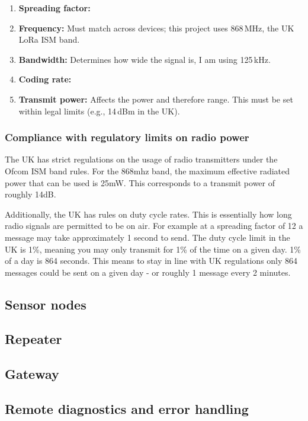 \begin{enumerate}
  \item \textbf{Spreading factor:}
  \item \textbf{Frequency:} Must match across devices; this project uses
        868\,MHz, the UK LoRa ISM band.
  \item \textbf{Bandwidth:} Determines how wide the signal is, I am using
        125\,kHz.
  \item \textbf{Coding rate:}
  \item \textbf{Transmit power:} Affects the power and therefore range. This
        must be set within legal limits (e.g., 14\,dBm in the UK).
\end{enumerate}

\subsubsection{Compliance with regulatory limits on radio power}

The UK has strict regulations on the usage of radio transmitters under the Ofcom
ISM band rules. For the 868mhz band, the maximum effective radiated power that
can be used is 25mW. This corresponds to a transmit power of roughly 14dB.

Additionally, the UK has rules on duty cycle rates. This is essentially how long
radio signals are permitted to be on air. For example at a spreading factor of
12 a message may take approximately 1 second to send. The duty cycle limit in
the UK is 1\%, meaning you may only transmit for 1\% of the time on a given day.
1\% of a day is 864 seconds. This means to stay in line with UK regulations only
864 messages could be sent on a given day - or roughly 1 message every 2
minutes.


\subsection{Sensor nodes}

\subsection{Repeater}

\subsection{Gateway}

\subsection{Remote diagnostics and error handling}

